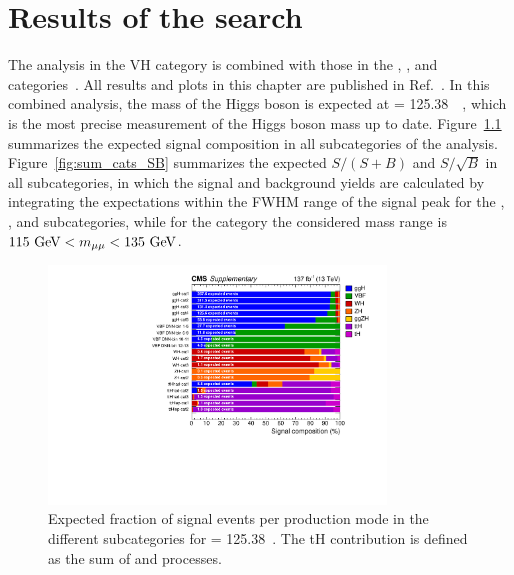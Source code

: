 \chapter{Results of the \texorpdfstring{\hmm}{H to muons} search} \label{chp:hmm_results}

The analysis in the VH category is combined with those in the \ggH, \qqH, and \ttH categories~\cite{Sirunyan_2021}.
All results and plots in this chapter are published in Ref.~\cite{Sirunyan_2021}.
In this combined analysis, the mass of the Higgs boson is expected at \mh = 125.38~\GeV~\cite{2020135425},
which is the most precise measurement of the Higgs boson mass up to date.
Figure~\ref{fig:sum_cats_comp} summarizes the expected signal composition in all subcategories of the \hmm analysis.
Figure~\ref{fig:sum_cats_SB} summarizes the expected $S/(S+B)$ and $S/\sqrt{B}$ in all subcategories,
in which the signal and background yields are calculated by integrating the expectations within the FWHM range of the signal peak for the \ggH, \VH, and \ttH subcategories,
while for the \qqH category the considered mass range is $115~\mbox{GeV} < m_{\mu\mu} < 135~\mbox{GeV}$.

\begin{figure}[!htb]
    \centering
    \includegraphics[width=0.80\textwidth]{pics/results/sig_composition.pdf}
    \caption{Expected fraction of signal events per production mode in the different subcategories for \mh = 125.38~\GeV.
             The tH contribution is defined as the sum of \tHq and \tHW processes.}
    \label{fig:sum_cats_comp}
\end{figure}

